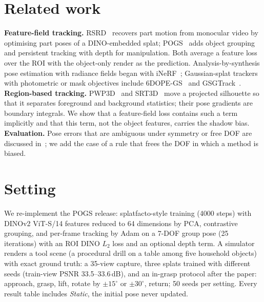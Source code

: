 \documentclass[conference]{IEEEtran}
\begin{document}
\section{Related work}
\textbf{Feature-field tracking.} RSRD~\cite{kerr2024rsrd} recovers part motion from monocular video by optimising
part poses of a DINO-embedded splat; POGS~\cite{yu2025pogs} adds object grouping and persistent tracking with depth
for manipulation. Both average a feature loss over the ROI with the object-only render as the prediction.
Analysis-by-synthesis pose estimation with radiance fields began with iNeRF~\cite{yen2021inerf}; Gaussian-splat
trackers with photometric or mask objectives include 6DOPE-GS~\cite{jin20246dope} and GSGTrack~\cite{gsgtrack2024}.
\textbf{Region-based tracking.} PWP3D~\cite{prisacariu2012pwp3d} and SRT3D~\cite{stoiber2022srt3d} move a projected
silhouette so that it separates foreground and background statistics; their pose gradients are boundary integrals.
We show that a feature-field loss contains such a term implicitly and that this term, not the object features,
carries the shadow bias. \textbf{Evaluation.} Pose errors that are ambiguous under symmetry or free DOF are discussed
in~\cite{hodan2016evaluation}; we add the case of a rule that frees the DOF in which a method is biased.

\section{Setting}
We re-implement the POGS release: splatfacto-style training (4000 steps) with DINOv2 ViT-S/14 features reduced to 64
dimensions by PCA, contrastive grouping, and per-frame tracking by Adam on a 7-DOF group pose (25 iterations) with an
ROI DINO $L_2$ loss and an optional depth term. A simulator renders a tool scene (a procedural drill on a table among
five household objects) with exact ground truth: a 35-view capture, three splats trained with different seeds
(train-view PSNR 33.5--33.6\,dB), and an in-grasp protocol after the paper: approach, grasp, lift, rotate by
$\pm15^\circ$ or $\pm30^\circ$, return; 50 seeds per setting. Every result table includes \emph{Static}, the initial
pose never updated.
\end{document}
